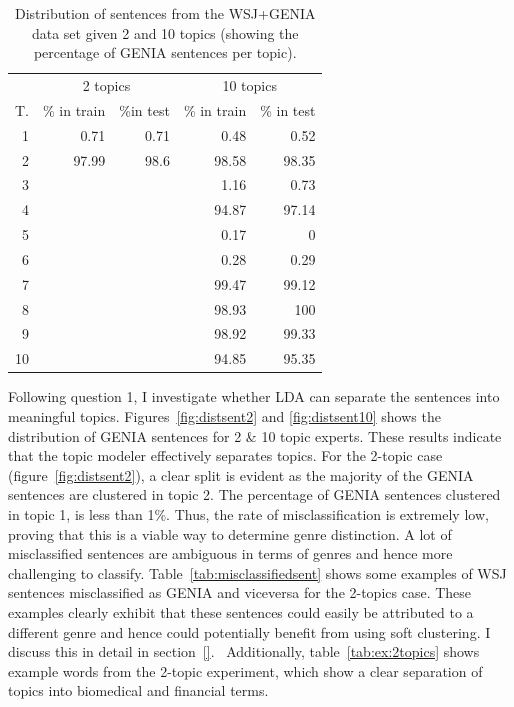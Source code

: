 \begin{table}[t!]
	\begin{center}
		\begin{tabular}{r|rr|rr} 
			& \multicolumn{2}{c|}{2 topics} & \multicolumn{2}{c}{10 topics}\\
			T. &\% in train & \%in test & \% in train & \% in test \\ 
			\hline
			1 	& 0.71	& 	0.71 	& 0.48 	& 0.52		\\ 
			2 	& 97.99	& 	98.6	& 98.58 	& 98.35				\\
			3 	& 		& 			& 1.16 	& 0.73			\\ 
			4 	& 		& 			& 94.87	& 97.14		\\
			5 	& 		& 			& 0.17	& 0			\\  
			6 	& 		& 			& 0.28 	& 0.29				\\  
			7 	& 		& 			& 99.47	& 99.12			\\  
			8 	& 		& 			& 98.93 	& 100		\\ 
			9 	& 		& 			& 98.92	& 99.33			\\ 
			10 	& 		&			& 94.85 	& 95.35			\\   
			\hline 
		\end{tabular}
	\end{center}
	\caption{Distribution of sentences from the WSJ+GENIA data set given 2 and 10 topics (showing the percentage of GENIA sentences per topic).\label{tab:cluster}}
\end{table}

Following question 1, I investigate whether LDA can separate the sentences into meaningful topics. 
Figures~\ref{fig:distsent2} and \ref{fig:distsent10} shows the distribution of GENIA sentences for 2 \& 10 topic experts. These results indicate that the topic modeler effectively separates topics. For the 2-topic case (figure~\ref{fig:distsent2}), a clear split is evident as the majority of the GENIA sentences are clustered in topic 2. The percentage of GENIA sentences clustered in topic 1, is less than 1\%. Thus, the rate of misclassification is extremely low, proving that this is a viable way to determine genre distinction. A lot of misclassified sentences are ambiguous in terms of genres and hence more challenging to classify. Table~\ref{tab:misclassifiedsent} shows some examples of WSJ sentences misclassified as GENIA and viceversa for the 2-topics case. These examples clearly exhibit that these sentences could easily be attributed to a different genre and hence could potentially benefit from using soft clustering. I discuss this in detail in section~\ref{}.~
Additionally, table~\ref{tab:ex:2topics} shows example words from the 2-topic experiment, which show a clear separation of topics into biomedical and financial terms.

